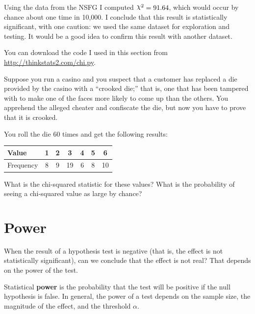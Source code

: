 \documentclass[12pt]{book}
\begin{document}
Using the data from the NSFG I computed $\goodchi^{2} = 91.64$, which would
occur by chance about one time in 10,000.  I conclude that this result
is statistically significant, with one caution: we used the
same dataset for exploration and testing.  It would be a good idea
to confirm this result with another dataset.

You can download the code I used in this section from
\url{http://thinkstats2.com/chi.py}.



\begin{exercise}
Suppose you run a casino and you suspect that a customer has
replaced a die provided by the casino with a ``crooked die;'' that
is, one that has been tampered with to make one of the faces more
likely to come up than the others.  You apprehend the alleged
cheater and confiscate the die, but now you have to prove that it
is crooked.

You roll the die 60 times and get the following results:

\begin{center}
\begin{tabular}{|l|c|c|c|c|c|c|}
\hline
Value     &  1  &  2  &  3  &  4  &  5  &  6  \\ 
\hline
\hline
Frequency &  8  &  9  &  19  &  6  &  8  &  10  \\
\hline
\end{tabular}
\end{center}

What is the chi-squared statistic for these values?  What is the
probability of seeing a chi-squared value as large by chance?

\end{exercise}


\section{Power}

When the result of a hypothesis test is negative (that is, the effect is
not statistically significant), can we conclude that the effect is not
real?  That depends on the power of the test.

Statistical {\bf power} is the probability that the test will be
positive if the null hypothesis is false.  In general, the power of a
test depends on the sample size, the magnitude of the effect, and the
threshold $\alpha$.
\end{document}
